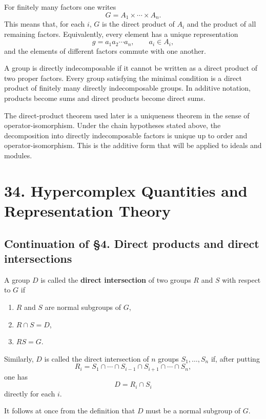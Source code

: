 \documentclass[11pt]{article}
\begin{document}
For finitely many factors one writes \[
  G=A_1\times\cdots\times A_n.
\] This means that, for each \(i\), \(G\) is the direct product of
\(A_i\) and the product of all remaining factors. Equivalently, every
element has a unique representation \[
  g=a_1a_2\cdots a_n,
  \qquad a_i\in A_i,
\] and the elements of different factors commute with one another.

A group is directly indecomposable if it cannot be written as a direct
product of two proper factors. Every group satisfying the minimal
condition is a direct product of finitely many directly indecomposable
groups. In additive notation, products become sums and direct products
become direct sums.

The direct-product theorem used later is a uniqueness theorem in the
sense of operator-isomorphism. Under the chain hypotheses stated above,
the decomposition into directly indecomposable factors is unique up to
order and operator-isomorphism. This is the additive form that will be
applied to ideals and modules.

\clearpage
\section{34. Hypercomplex Quantities and Representation
Theory}\label{hypercomplex-quantities-and-representation-theory}

\subsection{Continuation of §4. Direct products and direct
intersections}\label{continuation-of-4.-direct-products-and-direct-intersections}

A group \(D\) is called the \textbf{direct intersection} of two groups
\(R\) and \(S\) with respect to \(G\) if

\begin{enumerate}
\def\labelenumi{\alph{enumi})}
\item
  \(R\) and \(S\) are normal subgroups of \(G\),
\item
  \(R\cap S=D\),
\item
  \(RS=G\).
\end{enumerate}

Similarly, \(D\) is called the direct intersection of \(n\) groups
\(S_1,\ldots,S_n\) if, after putting \[
  R_i=S_1\cap\cdots\cap S_{i-1}\cap S_{i+1}\cap\cdots\cap S_n,
\] one has \[
  D=R_i\cap S_i
\] directly for each \(i\).

It follows at once from the definition that \(D\) must be a normal
subgroup of \(G\).
\end{document}
